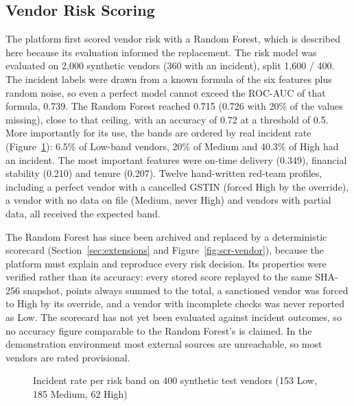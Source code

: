 \subsection{Vendor Risk Scoring}
The platform first scored vendor risk with a Random Forest, which is described here because its evaluation informed the replacement. The risk model was evaluated on 2,000 synthetic vendors (360 with an incident), split 1,600 / 400. The incident labels were drawn from a known formula of the six features plus random noise, so even a perfect model cannot exceed the ROC-AUC of that formula, 0.739. The Random Forest reached 0.715 (0.726 with 20\% of the values missing), close to that ceiling, with an accuracy of 0.72 at a threshold of 0.5. More importantly for its use, the bands are ordered by real incident rate (Figure~\ref{fig:bands}): 6.5\% of Low-band vendors, 20\% of Medium and 40.3\% of High had an incident. The most important features were on-time delivery (0.349), financial stability (0.210) and tenure (0.207). Twelve hand-written red-team profiles, including a perfect vendor with a cancelled GSTIN (forced High by the override), a vendor with no data on file (Medium, never High) and vendors with partial data, all received the expected band.

The Random Forest has since been archived and replaced by a deterministic scorecard (Section~\ref{sec:extensions} and Figure~\ref{fig:scr-vendor}), because the platform must explain and reproduce every risk decision. Its properties were verified rather than its accuracy: every stored score replayed to the same SHA-256 snapshot, points always summed to the total, a sanctioned vendor was forced to High by its override, and a vendor with incomplete checks was never reported as Low. The scorecard has not yet been evaluated against incident outcomes, so no accuracy figure comparable to the Random Forest's is claimed. In the demonstration environment most external sources are unreachable, so most vendors are rated provisional.

\begin{figure}[H]
\centering
{}
\caption[Incident rate per risk band]{Incident rate per risk band on 400 synthetic test vendors (153 Low, 185 Medium, 62 High)}\label{fig:bands}
\end{figure}

